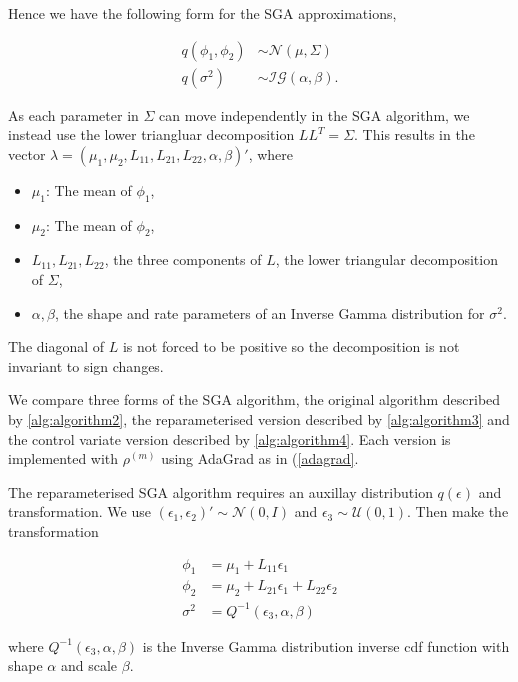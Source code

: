 \documentclass{article}\usepackage[]{graphicx}\usepackage[]{color}
\numberwithin{equation}{section}
\begin{document}
Hence we have the following form for the SGA approximations,

\begin{align}
q(\phi_1, \phi_2) &\sim \mathcal{N}(\mu, \Sigma) \nonumber \\
q(\sigma^2) &\sim \mathcal{IG}(\alpha, \beta). \nonumber
\end{align}

As each parameter in $\Sigma$ can move independently in the SGA algorithm, we instead use the lower triangluar decomposition $L L^T = \Sigma$. This results in the vector $\lambda = (\mu_1, \mu_2, L_{11}, L_{21}, L_{22}, \alpha, \beta)'$, where

\begin{itemize}
\item $\mu_1$: The mean of $\phi_1$,
\item $\mu_2$: The mean of $\phi_2$,
\item $L_{11}, L_{21}, L_{22}$, the three components of $L$, the lower triangular decomposition of $\Sigma$,
\item $\alpha, \beta$, the shape and rate parameters of an Inverse Gamma distribution for $\sigma^2$.
\end{itemize}

The diagonal of $L$ is not forced to be positive so the decomposition is not invariant to sign changes.

We compare three forms of the SGA algorithm, the original algorithm described by \ref{alg:algorithm2}, the reparameterised version described by \ref{alg:algorithm3} and the control variate version described by \ref{alg:algorithm4}. Each version is implemented with $\rho^(m)$ using AdaGrad as in (\ref{adagrad}. 

The reparameterised SGA algorithm requires an auxillay distribution $q(\epsilon)$ and transformation. We use $(\epsilon_1, \epsilon_2)' \sim \mathcal{N}(0, I)$ and $\epsilon_3 \sim \mathcal{U}(0, 1)$. Then make the transformation

\begin{align}
\phi_1 &= \mu_1 + L_11 \epsilon_1 \nonumber \\
\phi_2 &= \mu_2 + L_21 \epsilon_1 + L_22 \epsilon_2 \nonumber \\
\sigma^2 &= Q^{-1}(\epsilon_3, \alpha, \beta) \nonumber
\end{align}

where $Q^{-1}(\epsilon_3, \alpha, \beta)$ is the Inverse Gamma distribution inverse cdf function with shape $\alpha$ and scale $\beta$.
\end{document}
